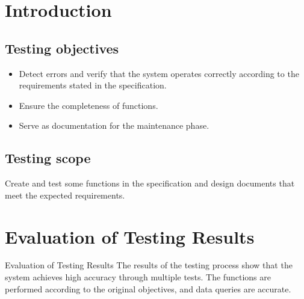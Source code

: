 \documentclass[../thesis.tex]{subfiles}
\begin{document}
\section{Introduction}
\subsection{Testing objectives}
\begin{itemize}
    \item Detect errors and verify that the system operates correctly according to the requirements stated in the specification.
    \item Ensure the completeness of functions.
    \item Serve as documentation for the maintenance phase.
\end{itemize}

\subsection{Testing scope}
Create and test some functions in the specification and design documents that meet the expected requirements.

\section{Evaluation of Testing Results}
Evaluation of Testing Results
The results of the testing process show that the system achieves high accuracy through multiple tests. The functions are performed according to the original objectives, and data queries are accurate.
\end{document}
